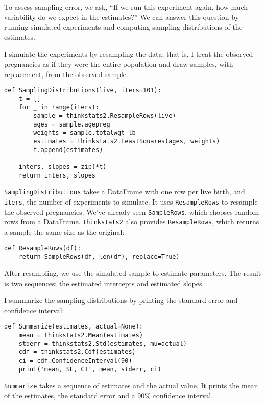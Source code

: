 To assess sampling error, we ask, ``If we run this experiment again,
how much variability do we expect in the estimates?''  We can
answer this question by running simulated experiments and computing
sampling distributions of the estimates.

I simulate the experiments by resampling the data; that is, I treat
the observed pregnancies as if they were the entire population
and draw samples, with replacement, from the observed sample.

\begin{verbatim}
def SamplingDistributions(live, iters=101):
    t = []
    for _ in range(iters):
        sample = thinkstats2.ResampleRows(live)
        ages = sample.agepreg
        weights = sample.totalwgt_lb
        estimates = thinkstats2.LeastSquares(ages, weights)
        t.append(estimates)

    inters, slopes = zip(*t)
    return inters, slopes
\end{verbatim}

{\tt SamplingDistributions} takes a DataFrame with one row per live
birth, and {\tt iters}, the number of experiments to simulate.  It
uses {\tt ResampleRows} to resample the observed pregnancies.  We've
already seen {\tt SampleRows}, which chooses random rows from a
DataFrame.  {\tt thinkstats2} also provides {\tt ResampleRows}, which
returns a sample the same size as the original:

\begin{verbatim}
def ResampleRows(df):
    return SampleRows(df, len(df), replace=True)
\end{verbatim}

After resampling, we use the simulated sample to estimate parameters.
The result is two sequences: the estimated intercepts and estimated
slopes.

I summarize the sampling distributions by printing the standard
error and confidence interval:

\begin{verbatim}
def Summarize(estimates, actual=None):
    mean = thinkstats2.Mean(estimates)
    stderr = thinkstats2.Std(estimates, mu=actual)
    cdf = thinkstats2.Cdf(estimates)
    ci = cdf.ConfidenceInterval(90)
    print('mean, SE, CI', mean, stderr, ci)
\end{verbatim}

{\tt Summarize} takes a sequence of estimates and the actual value.
It prints the mean of the estimates, the standard error and 
a 90\% confidence interval.

